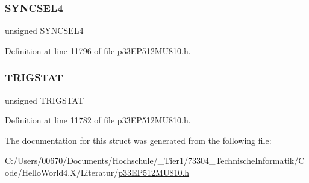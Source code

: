 \mbox{\label{structtag_o_c10_c_o_n2_b_i_t_s_a0cd5bbe196c7974953909d27a6307bb7}} 
\subsubsection{\texorpdfstring{S\+Y\+N\+C\+S\+E\+L4}{SYNCSEL4}}
{\footnotesize\ttfamily unsigned S\+Y\+N\+C\+S\+E\+L4}



Definition at line 11796 of file p33\+E\+P512\+M\+U810.\+h.

\mbox{\label{structtag_o_c10_c_o_n2_b_i_t_s_ab379549de54ac93ad4aa73686c34cb7c}} 
\subsubsection{\texorpdfstring{T\+R\+I\+G\+S\+T\+AT}{TRIGSTAT}}
{\footnotesize\ttfamily unsigned T\+R\+I\+G\+S\+T\+AT}



Definition at line 11782 of file p33\+E\+P512\+M\+U810.\+h.



The documentation for this struct was generated from the following file\+:\begin{DoxyCompactItemize}
\item 
C\+:/\+Users/00670/\+Documents/\+Hochschule/\+\_\+\+Tier1/73304\+\_\+\+Technische\+Informatik/\+Code/\+Hello\+World4.\+X/\+Literatur/\hyperlink{p33_e_p512_m_u810_8h}{p33\+E\+P512\+M\+U810.\+h}\end{DoxyCompactItemize}

